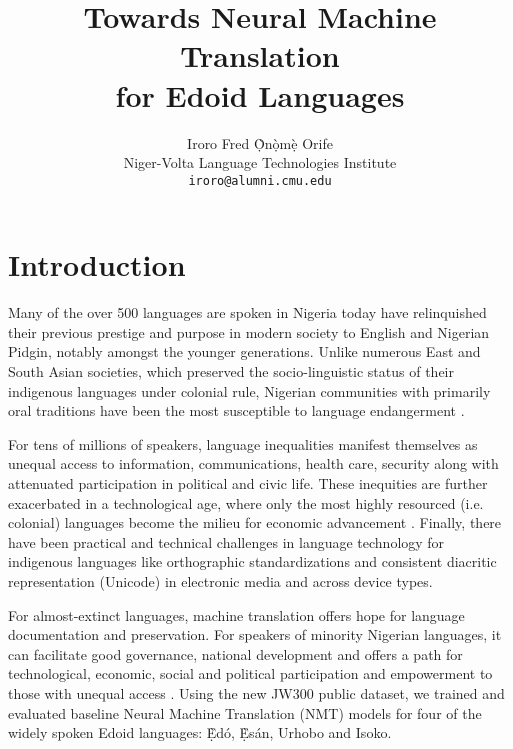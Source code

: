 \documentclass{article} %
\title{Towards Neural Machine Translation \\ for Edoid Languages}
\author{Iroro Fred \d{\`O}n\d{\`o}m\d{\`e} Orife \\
Niger-Volta Language Technologies Institute\\
\texttt{iroro@alumni.cmu.edu} \\
}
\begin{document}
\maketitle



\section{Introduction}

Many of the over 500 languages are spoken in Nigeria today have relinquished their previous prestige and purpose in modern society to English and Nigerian Pidgin, notably amongst the younger generations. Unlike numerous East and South Asian societies, which preserved the socio-linguistic status of their indigenous languages under colonial rule, Nigerian communities with primarily oral traditions have been the most susceptible to language endangerment \citep{rolle2013phonetics, omo2004esan}.

For tens of millions of speakers, language inequalities manifest themselves as unequal access to information, communications, health care, security along with attenuated participation in political and civic life. These inequities are further exacerbated in a technological age, where only the most highly resourced (i.e. colonial) languages become the milieu for economic advancement \citep{odojelanguage, awobuluyi201626, ganagana2019contrastive}. Finally, there have been practical and technical challenges in language technology for indigenous languages like orthographic standardizations and consistent diacritic representation (Unicode) in electronic media and across device types. 

For almost-extinct languages, machine translation offers hope for language documentation and preservation. For speakers of minority Nigerian languages, it can facilitate good governance, national development and offers a path for technological, economic, social and political participation and empowerment to those with unequal access \citep{odoje201612, odojelanguage}. Using the new JW300 public dataset, we trained and evaluated baseline Neural Machine Translation (NMT) models for four of the widely spoken Edoid languages: \d{\`E}d{\'o}, \d{\`E}s{\'a}n, Urhobo and Isoko. 
\end{document}
